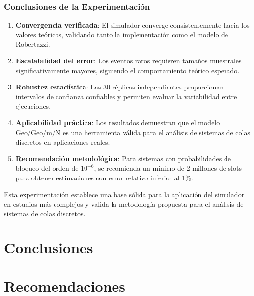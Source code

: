 \documentclass{article}
\begin{document}
\subsubsection{Conclusiones de la Experimentación}
\begin{enumerate}
    \item \textbf{Convergencia verificada}: El simulador converge consistentemente hacia los valores teóricos, validando tanto la implementación como el modelo de Robertazzi.
    \item \textbf{Escalabilidad del error}: Los eventos raros requieren tamaños muestrales significativamente mayores, siguiendo el comportamiento teórico esperado.
    \item \textbf{Robustez estadística}: Las 30 réplicas independientes proporcionan intervalos de confianza confiables y permiten evaluar la variabilidad entre ejecuciones.
    \item \textbf{Aplicabilidad práctica}: Los resultados demuestran que el modelo Geo/Geo/m/N es una herramienta válida para el análisis de sistemas de colas discretos en aplicaciones reales.
    \item \textbf{Recomendación metodológica}: Para sistemas con probabilidades de bloqueo del orden de $10^{-6}$, se recomienda un mínimo de 2 millones de slots para obtener estimaciones con error relativo inferior al 1\%.
\end{enumerate}

Esta experimentación establece una base sólida para la aplicación del simulador en estudios más complejos y valida la metodología propuesta para el análisis de sistemas de colas discretos.



\section{Conclusiones}\label{sec:concl}



\section{Recomendaciones}\label{secrecomen}
\end{document}
